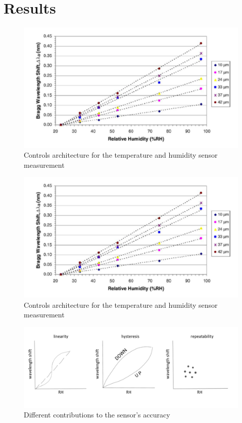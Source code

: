 \newpage


\section{Results}
\label{fbg_results}

\begin{figure}[!h]
\centering
\includegraphics[width=0.85\columnwidth]{Chapter5/images/yeo_coating.png}
\caption{Controls architecture for the temperature and humidity sensor measurement}
\label{fig:fos_coating0}
\end{figure}

\begin{figure}[!h]
\centering
\includegraphics[width=0.85\columnwidth]{Chapter5/images/yeo_coating.png}
\caption{Controls architecture for the temperature and humidity sensor measurement}
\label{fig:fos_coating}
\end{figure}


\begin{figure}[!h]
\centering
\includegraphics[width=0.85\columnwidth]{Chapter5/images/uncerainty.png}
\caption{Different contributions to the sensor's accuracy}
\label{fig:accuracy}
\end{figure}
